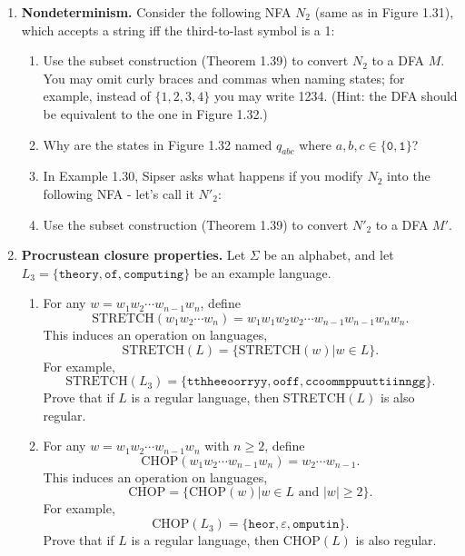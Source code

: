 \documentclass{article}
\newcommand{\e}{\varepsilon}
\newcommand{\s}{\Sigma}
\newcommand{\newp}{\\[2mm]}
\begin{document}
\begin{enumerate}
\begin{enumerate}
    \end{enumerate}
    \item \textbf{Nondeterminism.} Consider the following NFA $N_2$ (same as in Figure 1.31), which accepts a string iff the third-to-last symbol is a 1:
    
    \begin{enumerate}
        \item Use the subset construction (Theorem 1.39) to convert $N_2$ to a DFA $M$. You may omit curly braces and commas when naming states; for example, instead of $\{1, 2, 3, 4\}$ you may write 1234. (Hint: the DFA should be equivalent to the one in Figure 1.32.)
        
        \item  Why are the states in Figure 1.32 named $q_{abc}$ where $a, b, c \in\{\texttt{0}, \texttt{1}\}$?\newp
        
        \item In Example 1.30, Sipser asks what happens if you modify $N_2$ into the following NFA - let’s call it $N'_2$:
        \newp
        
        \item Use the subset construction (Theorem 1.39) to convert $N'_2$ to a DFA $M'$.
        
    \end{enumerate}
\newpage
    \item \textbf{Procrustean closure properties.} Let $\s$ be an alphabet, and let $L_3 = \{\texttt{theory}, \texttt{of}, \texttt{computing}\}$ be an example language.
    \begin{enumerate}
        \item For any $w = w_1w_2 \cdots w_{n-1}w_n$, define
        \[
        \text{STRETCH}(w_1w_2 \cdots w_n) = w_1w_1w_2w_2 \cdots w_{n-1}w_{n-1}w_nw_n. 
        \]
        This induces an operation on languages,
        \[
        \text{STRETCH}(L) = \{\text{STRETCH}(w) | w \in L\}.  
        \]
        For example,
        \[
        \text{STRETCH}(L_3) = \{\texttt{tthheeoorryy}, \texttt{ooff}, \texttt{ccoommppuuttiinngg}\}.
        \]
        Prove that if $L$ is a regular language, then STRETCH$(L)$ is also regular.\newp
        
\newpage
        \item For any $w = w_1w_2\cdots w_{n-1}w_n$ with $n \geq 2$, define 
        \[\text{CHOP}(w_1w_2\cdots w_{n-1}w_n) = w_2\cdots w_{n-1}.\] 
        This induces an operation on languages,
        \[\text{CHOP} = \{\text{CHOP}(w) | w \in L \text{ and } |w| \geq 2\}.\]
        For example,
        \[
            \text{CHOP}(L_3) = \{\texttt{heor}, \e, \texttt{omputin}\}.
        \]
        Prove that if $L$ is a regular language, then CHOP$(L)$ is also regular.\newp
        
    \end{enumerate}
\end{enumerate}
\end{document}

